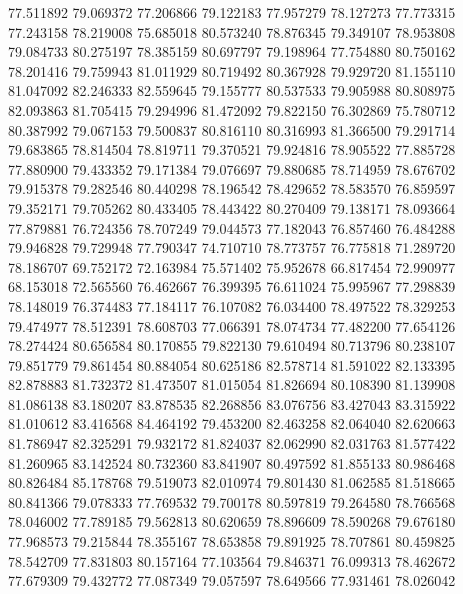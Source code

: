 77.511892
79.069372
77.206866
79.122183
77.957279
78.127273
77.773315
77.243158
78.219008
75.685018
80.573240
78.876345
79.349107
78.953808
79.084733
80.275197
78.385159
80.697797
79.198964
77.754880
80.750162
78.201416
79.759943
81.011929
80.719492
80.367928
79.929720
81.155110
81.047092
82.246333
82.559645
79.155777
80.537533
79.905988
80.808975
82.093863
81.705415
79.294996
81.472092
79.822150
76.302869
75.780712
80.387992
79.067153
79.500837
80.816110
80.316993
81.366500
79.291714
79.683865
78.814504
78.819711
79.370521
79.924816
78.905522
77.885728
77.880900
79.433352
79.171384
79.076697
79.880685
78.714959
78.676702
79.915378
79.282546
80.440298
78.196542
78.429652
78.583570
76.859597
79.352171
79.705262
80.433405
78.443422
80.270409
79.138171
78.093664
77.879881
76.724356
78.707249
79.044573
77.182043
76.857460
76.484288
79.946828
79.729948
77.790347
74.710710
78.773757
76.775818
71.289720
78.186707
69.752172
72.163984
75.571402
75.952678
66.817454
72.990977
68.153018
72.565560
76.462667
76.399395
76.611024
75.995967
77.298839
78.148019
76.374483
77.184117
76.107082
76.034400
78.497522
78.329253
79.474977
78.512391
78.608703
77.066391
78.074734
77.482200
77.654126
78.274424
80.656584
80.170855
79.822130
79.610494
80.713796
80.238107
79.851779
79.861454
80.884054
80.625186
82.578714
81.591022
82.133395
82.878883
81.732372
81.473507
81.015054
81.826694
80.108390
81.139908
81.086138
83.180207
83.878535
82.268856
83.076756
83.427043
83.315922
81.010612
83.416568
84.464192
79.453200
82.463258
82.064040
82.620663
81.786947
82.325291
79.932172
81.824037
82.062990
82.031763
81.577422
81.260965
83.142524
80.732360
83.841907
80.497592
81.855133
80.986468
80.826484
85.178768
79.519073
82.010974
79.801430
81.062585
81.518665
80.841366
79.078333
77.769532
79.700178
80.597819
79.264580
78.766568
78.046002
77.789185
79.562813
80.620659
78.896609
78.590268
79.676180
77.968573
79.215844
78.355167
78.653858
79.891925
78.707861
80.459825
78.542709
77.831803
80.157164
77.103564
79.846371
76.099313
78.462672
77.679309
79.432772
77.087349
79.057597
78.649566
77.931461
78.026042
